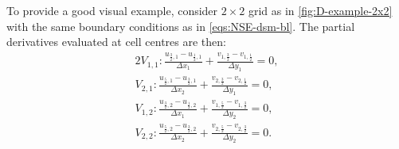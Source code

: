 \documentclass{article}
\begin{document}
To provide a good visual example, consider $2 \times 2$ grid as in \cref{fig:D-example-2x2} with the same boundary conditions as in \cref{eqs:NSE-dsm-bl}. The partial derivatives evaluated at cell centres are then: 
\begin{alignat*}{2}
	V_{1,1}:\frac{u_{\frac{3}{2},1} - u_{\frac{1}{2},1}}{\Delta x_1}+\frac{v_{1,\frac{3}{2}} - v_{1,\frac{1}{2}}}{\Delta y_1}=0,\\
	V_{2,1}: \frac{u_{\frac{5}{2},1} - u_{\frac{3}{2},1}}{\Delta x_2}+\frac{v_{2,\frac{3}{2}} - v_{2,\frac{1}{2}}}{\Delta y_1}=0,\\
	V_{1,2}:\frac{u_{\frac{3}{2},2} - u_{\frac{1}{2},2}}{\Delta x_1}+\frac{v_{1,\frac{5}{2}} - v_{1,\frac{3}{2}}}{\Delta y_2}=0,\\
	V_{2,2}:\frac{u_{\frac{5}{2},2} - u_{\frac{3}{2},2}}{\Delta x_2}+\frac{v_{2,\frac{5}{2}} - v_{2,\frac{3}{2}}}{\Delta y_2}=0.
\end{alignat*}

\end{document}
